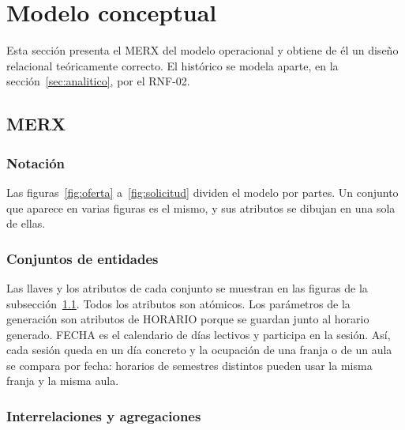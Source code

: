 \section{Modelo conceptual}\label{sec:modelo}

Esta sección presenta el MERX del modelo operacional y obtiene de él un diseño relacional teóricamente correcto. El histórico se modela aparte, en la sección~\ref{sec:analitico}, por el RNF-02.

\subsection{MERX}\label{sec:merx}

\subsubsection{Notación}

{\setlength{\fboxsep}{8pt}\small
\noindent{}}

Las figuras~\ref{fig:oferta} a~\ref{fig:solicitud} dividen el modelo por partes. Un conjunto que aparece en varias figuras es el mismo, y sus atributos se dibujan en una sola de ellas.

\subsubsection{Conjuntos de entidades}

Las llaves y los atributos de cada conjunto se muestran en las figuras de la subsección~\ref{sec:merx}. Todos los atributos son atómicos. Los parámetros de la generación son atributos de HORARIO porque se guardan junto al horario generado. FECHA es el calendario de días lectivos y participa en la sesión. Así, cada sesión queda en un día concreto y la ocupación de una franja o de un aula se compara por fecha: horarios de semestres distintos pueden usar la misma franja y la misma aula.

\subsubsection{Interrelaciones y agregaciones}

